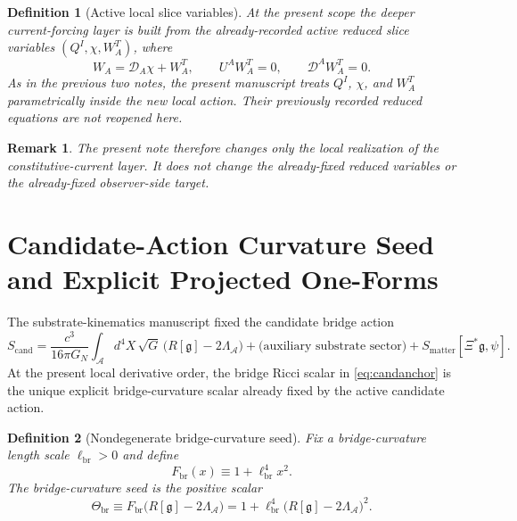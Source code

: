 \documentclass[11pt]{article}
\newcommand{\Sub}{\mathcal{A}}
\newcommand{\BridgeMetric}{\mathfrak g}
\newcommand{\ObserverMap}{\Xi}
\newcommand{\SpatialD}{\mathcal D}
\newcommand{\CandAction}{S_{\mathrm{cand}}}
\newcommand{\CurvSeed}{\Theta_{\mathrm{br}}}
\newcommand{\CurvScale}{\ell_{\mathrm{br}}}
\newcommand{\CurvProfile}{F_{\mathrm{br}}}
\newtheorem{definition}{Definition}
\newtheorem{remark}{Remark}
\begin{document}
\begin{definition}[Active local slice variables]
\label{def:activeslice}
At the present scope the deeper current-forcing layer is built from the already-recorded active reduced slice variables \((Q^I,\chi,W_A^T)\), where
\begin{equation}
W_A=\SpatialD_A\chi+W_A^T,
\qquad
U^AW_A^T=0,
\qquad
\SpatialD^AW_A^T=0.
\label{eq:Wdecomp}
\end{equation}
As in the previous two notes, the present manuscript treats \(Q^I\), \(\chi\), and \(W_A^T\) parametrically inside the new local action. Their previously recorded reduced equations are not reopened here.
\end{definition}

\begin{remark}
The present note therefore changes only the local realization of the constitutive-current layer. It does not change the already-fixed reduced variables or the already-fixed observer-side target.
\end{remark}

\section{Candidate-Action Curvature Seed and Explicit Projected One-Forms}

The substrate-kinematics manuscript fixed the candidate bridge action
\begin{equation}
\CandAction
=
\frac{c^3}{16\pi G_N}
\int_{\Sub} d^4X\,\sqrt{G}\,\bigl(R[\BridgeMetric]-2\Lambda_{\Sub}\bigr)
+\text{(auxiliary substrate sector)}
+S_{\mathrm{matter}}[\ObserverMap^\ast\BridgeMetric,\psi].
\label{eq:candanchor}
\end{equation}
At the present local derivative order, the bridge Ricci scalar in \eqref{eq:candanchor} is the unique explicit bridge-curvature scalar already fixed by the active candidate action.

\begin{definition}[Nondegenerate bridge-curvature seed]
\label{def:seed}
Fix a bridge-curvature length scale \(\CurvScale>0\) and define
\begin{equation}
\CurvProfile(x)\equiv 1+\CurvScale^4x^2.
\label{eq:Fdef}
\end{equation}
The \emph{bridge-curvature seed} is the positive scalar
\begin{equation}
\CurvSeed
\equiv
\CurvProfile\!\bigl(R[\BridgeMetric]-2\Lambda_{\Sub}\bigr)
=
1+\CurvScale^4\bigl(R[\BridgeMetric]-2\Lambda_{\Sub}\bigr)^2.
\label{eq:seed}
\end{equation}
\end{definition}
\end{document}
